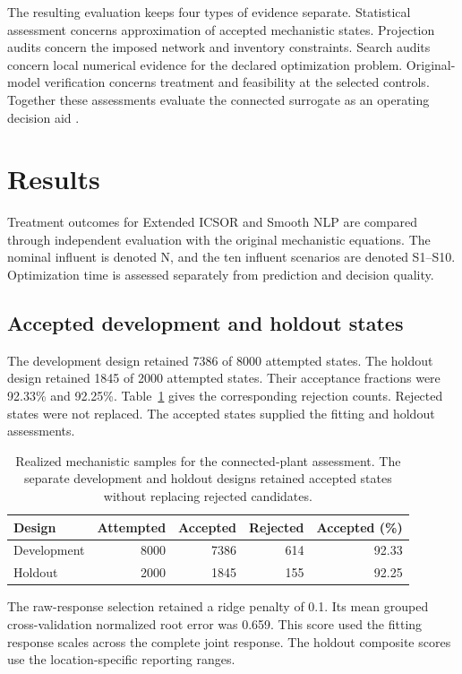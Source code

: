 The resulting evaluation keeps four types of evidence separate. Statistical assessment concerns approximation of accepted mechanistic states. Projection audits concern the imposed network and inventory constraints. Search audits concern local numerical evidence for the declared optimization problem. Original-model verification concerns treatment and feasibility at the selected controls. Together these assessments evaluate the connected surrogate as an operating decision aid \citep{BhosekarIerapetritou2018,Pedrozo2025}.

\section{Results}
\label{sec:plant_results}

Treatment outcomes for Extended ICSOR and Smooth NLP are compared through independent evaluation with the original mechanistic equations. The nominal influent is denoted N, and the ten influent scenarios are denoted S1--S10. Optimization time is assessed separately from prediction and decision quality.

\subsection{Accepted development and holdout states}

The development design retained 7386 of 8000 attempted states. The holdout design retained 1845 of 2000 attempted states. Their acceptance fractions were 92.33\% and 92.25\%. Table~\ref{tab:plant_sample_results} gives the corresponding rejection counts. Rejected states were not replaced. The accepted states supplied the fitting and holdout assessments.

\begin{table}[htbp]
\centering\small
\caption{Realized mechanistic samples for the connected-plant assessment. The separate development and holdout designs retained accepted states without replacing rejected candidates.}
\label{tab:plant_sample_results}
\begin{tabular}{lrrrr}
\toprule
Design & Attempted & Accepted & Rejected & Accepted (\%)\\
\midrule
Development & 8000 & 7386 & 614 & 92.33\\
Holdout & 2000 & 1845 & 155 & 92.25\\
\bottomrule
\end{tabular}
\end{table}

The raw-response selection retained a ridge penalty of 0.1. Its mean grouped cross-validation normalized root error was 0.659. This score used the fitting response scales across the complete joint response. The holdout composite scores use the location-specific reporting ranges.

